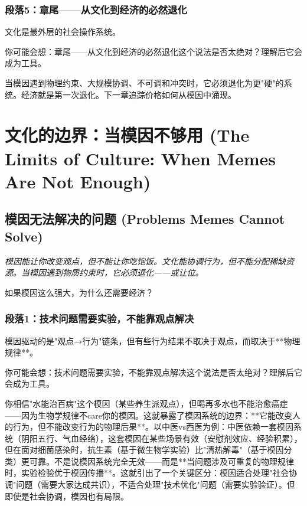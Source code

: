 \documentclass[a4paper,12pt]{book}
\newenvironment{motivation}{\begin{tcolorbox}[colback=gray!10,colframe=gray!60,title=\textit{本章动机},fonttitle=\bfseries,arc=0mm,leftrule=3mm]\small\itshape}{\end{tcolorbox}}
\newenvironment{questionbox}{\begin{tcolorbox}[colback=red!3!white,colframe=red!60!black]}{\end{tcolorbox}}
\begin{document}
\begin{motivation}
\begin{motivation}
\begin{motivation}
	\subsubsection*{段落5：章尾——从文化到经济的必然退化}
	文化是最外层的社会操作系统。
	\begin{tcolorbox}[colback=yellow!5, title=\textit{读者行为预测}]
		你可能会想：章尾——从文化到经济的必然退化这个说法是否太绝对？理解后它会成为工具。
	\end{tcolorbox}

当模因遇到物理约束、大规模协调、不可调和冲突时，它必须退化为更"硬"的系统。经济就是第一次退化。下一章追踪价格如何从模因中涌现。


	
	\section{文化的边界：当模因不够用 (The Limits of Culture: When Memes Are Not Enough)}

	\subsection{模因无法解决的问题 (Problems Memes Cannot Solve)}
	\begin{motivation}
		模因能让你改变观点，但不能让你吃饱饭。文化能协调行为，但不能分配稀缺资源。当模因遇到物质约束时，它必须退化——或让位。
	\end{motivation}
	\begin{questionbox}
		如果模因这么强大，为什么还需要经济？
	\end{questionbox}

	\subsubsection*{段落1：技术问题需要实验，不能靠观点解决}
	模因驱动的是"观点→行为"链条，但有些行为结果不取决于观点，而取决于**物理规律**。
	\begin{tcolorbox}[colback=yellow!5, title=\textit{读者行为预测}]
		你可能会想：技术问题需要实验，不能靠观点解决这个说法是否太绝对？理解后它会成为工具。
	\end{tcolorbox}

你相信"水能治百病"这个模因（某些养生派观点），但喝再多水也不能治愈癌症——因为生物学规律不care你的模因。这就暴露了模因系统的边界：**它能改变人的行为，但不能改变行为的物理后果**。以中医vs西医为例：中医依赖一套模因系统（阴阳五行、气血经络），这套模因在某些场景有效（安慰剂效应、经验积累），但在面对细菌感染时，抗生素（基于微生物学实验）比"清热解毒"（基于模因分类）更可靠。不是说模因系统完全无效——而是**当问题涉及可重复的物理规律时，实验检验优于模因传播**。这就引出了一个关键区分：模因适合处理"社会协调"问题（需要大家达成共识），不适合处理"技术优化"问题（需要实验验证）。但即使是社会协调，模因也有局限。


\end{motivation}
\end{motivation}
\end{motivation}
\end{document}
